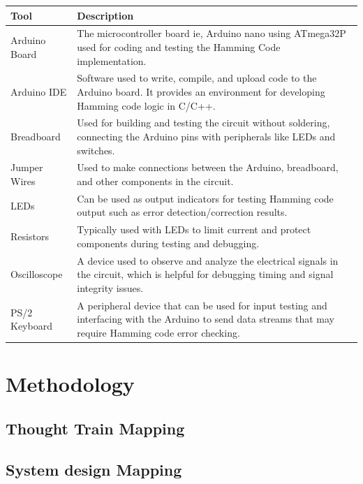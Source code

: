 \documentclass{article}
\begin{document}
\begin{tabular}{|l|p{10cm}|}
\hline
\textbf{Tool} & \textbf{Description} \\
\hline
Arduino Board & The microcontroller board ie, Arduino nano using ATmega32P used for coding and testing the Hamming Code implementation. \\
\hline
Arduino IDE & Software used to write, compile, and upload code to the Arduino board. It provides an environment for developing Hamming code logic in C/C++. \\
\hline
Breadboard & Used for building and testing the circuit without soldering, connecting the Arduino pins with peripherals like LEDs and switches. \\
\hline
Jumper Wires & Used to make connections between the Arduino, breadboard, and other components in the circuit. \\
\hline
LEDs & Can be used as output indicators for testing Hamming code output such as error detection/correction results. \\
\hline
Resistors & Typically used with LEDs to limit current and protect components during testing and debugging. \\
\hline
Oscilloscope & A device used to observe and analyze the electrical signals in the circuit, which is helpful for debugging timing and signal integrity issues. \\
\hline
PS/2 Keyboard & A peripheral device that can be used for input testing and interfacing with the Arduino to send data streams that may require Hamming code error checking. \\
\hline
\end{tabular}







\pagebreak

\section{Methodology}
 \subsection{Thought Train Mapping}
    
 \subsection{System design Mapping}
    
\end{document}

